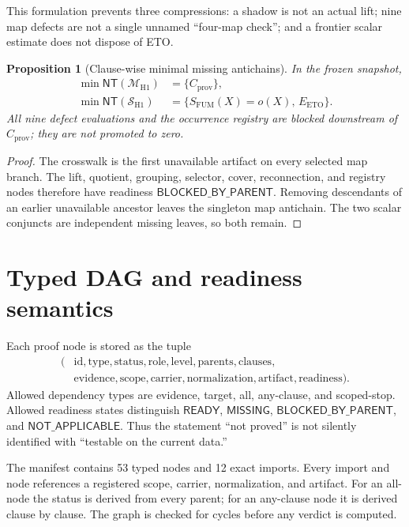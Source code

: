 \documentclass[11pt]{article}
\newtheorem{proposition}[theorem]{Proposition}
\theoremstyle{definition}
\newcommand{\cM}{\mathcal M}
\newcommand{\cS}{\mathcal S}
\newcommand{\NT}{\mathsf{NT}}
\begin{document}
This formulation prevents three compressions: a shadow is not an
actual lift; nine map defects are not a single unnamed ``four-map
check''; and a frontier scalar estimate does not dispose of ETO.

\begin{proposition}[Clause-wise minimal missing antichains]
\label{prop:antichain}
In the frozen snapshot,
\[
\begin{aligned}
 \min\NT(\cM_{\mathrm{H1}})
  &=\{C_{\mathrm{prov}}\},\\
 \min\NT(\cS_{\mathrm{H1}})
  &=\{S_{\mathrm{FUM}}(X)=o(X),\,E_{\mathrm{ETO}}\}.
\end{aligned}
\]
All nine defect evaluations and the occurrence registry are blocked
downstream of \(C_{\mathrm{prov}}\); they are not promoted to zero.
\end{proposition}

\begin{proof}
The crosswalk is the first unavailable artifact on every selected
map branch.  The lift, quotient, grouping, selector, cover,
reconnection, and registry nodes therefore have readiness
\(\mathsf{BLOCKED\_BY\_PARENT}\).  Removing descendants of an earlier
unavailable ancestor leaves the singleton map antichain.  The two
scalar conjuncts are independent missing leaves, so both remain.
\end{proof}

\section{Typed DAG and readiness semantics}

Each proof node is stored as the tuple
\[
\begin{split}
(&\mathrm{id},\mathrm{type},\mathrm{status},\mathrm{role},
  \mathrm{level},\mathrm{parents},\mathrm{clauses},\\[-2mm]
 &\mathrm{evidence},\mathrm{scope},\mathrm{carrier},
  \mathrm{normalization},\mathrm{artifact},\mathrm{readiness}).
\end{split}
\]
Allowed dependency types are evidence, target, all, any-clause, and
scoped-stop.  Allowed readiness states distinguish
\(\mathsf{READY}\), \(\mathsf{MISSING}\),
\(\mathsf{BLOCKED\_BY\_PARENT}\), and
\(\mathsf{NOT\_APPLICABLE}\).  Thus the statement ``not proved'' is
not silently identified with ``testable on the current data.''

The manifest contains 53 typed nodes and 12 exact imports.  Every
import and node references a registered scope, carrier,
normalization, and artifact.  For an all-node the status is derived
from every parent; for an any-clause node it is derived clause by
clause.  The graph is checked for cycles before any verdict is
computed.
\end{document}
